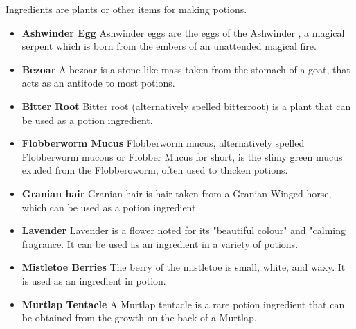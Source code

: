 Ingredients are plants or other items for making potions.\\

\begin{itemize}
 \item \textbf {Ashwinder Egg}
 Ashwinder eggs are the eggs of the Ashwinder , a magical serpent  which is born from the embers of an unattended magical fire.

 \item \textbf {Bezoar}
A bezoar is a stone-like mass taken from the stomach of a goat, that acts as an antitode to most potions.

 \item \textbf {Bitter Root}
Bitter root (alternatively spelled bitterroot) is a plant that can be used as a potion ingredient.

 \item \textbf {Flobberworm Mucus}
  Flobberworm mucus, alternatively spelled Flobberworm mucous or Flobber Mucus for short, is the slimy green mucus exuded from the Flobberoworm, often used to thicken potions.

 \item \textbf {Granian hair}
  Granian hair is hair taken from a Granian Winged horse, which can be used as a potion ingredient.

 \item \textbf {Lavender}
Lavender is a flower noted for its "beautiful colour" and "calming fragrance. It can be used as an ingredient in a variety of potions.

 \item \textbf {Mistletoe Berries}
The berry of the mistletoe is small, white, and waxy. It is used as an ingredient in potion.

 \item \textbf {Murtlap Tentacle}
A Murtlap tentacle is a rare potion ingredient that can be obtained from the growth on the back of a Murtlap.


\end{itemize}
